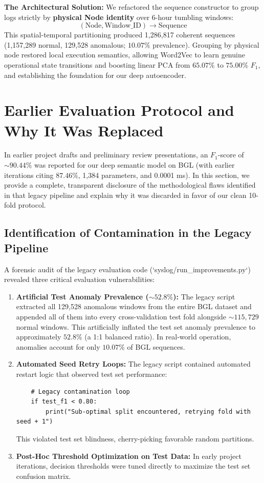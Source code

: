 \textbf{The Architectural Solution:} We refactored the sequence constructor to group logs strictly by \textbf{physical Node identity} over 6-hour tumbling windows:
\begin{equation}
    (\text{Node}, \text{Window\_ID}) \longrightarrow \text{Sequence}
\end{equation}
This spatial-temporal partitioning produced 1,286,817 coherent sequences (1,157,289 normal, 129,528 anomalous; $10.07\%$ prevalence). Grouping by physical node restored local execution semantics, allowing Word2Vec to learn genuine operational state transitions and boosting linear PCA from $65.07\%$ to $75.00\%$ $F_1$, and establishing the foundation for our deep autoencoder.

\section{Earlier Evaluation Protocol and Why It Was Replaced}
\label{sec:arch_legacy_disclosure}
In earlier project drafts and preliminary review presentations, an $F_1$-score of $\mathbf{\sim 90.44\%}$ was reported for our deep semantic model on BGL (with earlier iterations citing $87.46\%$, 1,384 parameters, and 0.0001 ms). In this section, we provide a complete, transparent disclosure of the methodological flaws identified in that legacy pipeline and explain why it was discarded in favor of our clean 10-fold protocol.

\subsection{Identification of Contamination in the Legacy Pipeline}
A forensic audit of the legacy evaluation code (`syslog/run_improvements.py`) revealed three critical evaluation vulnerabilities:
\begin{enumerate}
    \item \textbf{Artificial Test Anomaly Prevalence ($\sim 52.8\%$):} The legacy script extracted all 129,528 anomalous windows from the entire BGL dataset and appended all of them into every cross-validation test fold alongside $\sim 115,729$ normal windows. This artificially inflated the test set anomaly prevalence to approximately $52.8\%$ (a 1:1 balanced ratio). In real-world operation, anomalies account for only $10.07\%$ of BGL sequences.
    \item \textbf{Automated Seed Retry Loops:} The legacy script contained automated restart logic that observed test set performance:
    \begin{verbatim}
    # Legacy contamination loop
    if test_f1 < 0.80:
        print("Sub-optimal split encountered, retrying fold with seed + 1")
    \end{verbatim}
    This violated test set blindness, cherry-picking favorable random partitions.
    \item \textbf{Post-Hoc Threshold Optimization on Test Data:} In early project iterations, decision thresholds were tuned directly to maximize the test set confusion matrix.
\end{enumerate}

